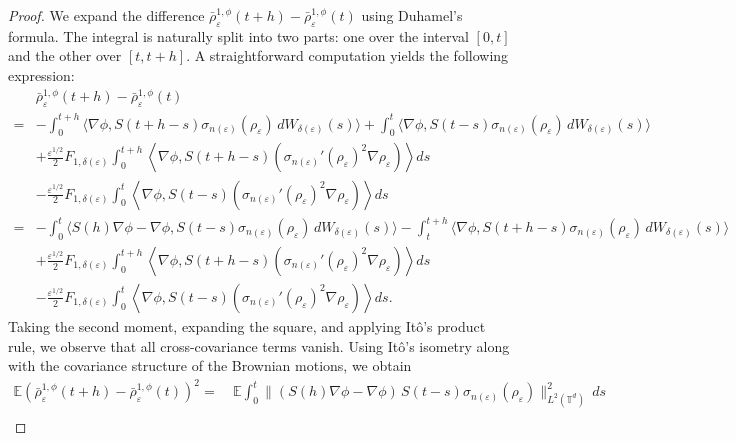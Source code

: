 \documentclass[UTF-8,reqno]{amsart}
\numberwithin{equation}{section}
\begin{document}
\begin{proof}
We expand the difference $\bar{\rho}^{1,\phi}_{\varepsilon}(t+h) - \bar{\rho}^{1,\phi}_{\varepsilon}(t)$ using Duhamel's formula. The integral is naturally split into two parts: one over the interval $[0, t]$ and the other over $[t, t+h]$. A straightforward computation yields the following expression:
\begin{align*}
&\bar{\rho}^{1,\phi}_{\varepsilon}(t+h) - \bar{\rho}^{1,\phi}_{\varepsilon}(t)\\ 
=& - \int_0^{t+h} \Big\langle \nabla\phi, S(t+h - s) \sigma_{n(\varepsilon)}(\rho_{\varepsilon}) \, dW_{\delta(\varepsilon)}(s) \Big\rangle 
+ \int_0^t \Big\langle \nabla\phi, S(t - s) \sigma_{n(\varepsilon)}(\rho_{\varepsilon}) \, dW_{\delta(\varepsilon)}(s) \Big\rangle \\
& + \frac{\varepsilon^{1/2}}{2} F_{1,\delta(\varepsilon)} \int_0^{t+h} \left\langle \nabla\phi, S(t+h - s) \left( \sigma_{n(\varepsilon)}'(\rho_{\varepsilon})^2 \nabla \rho_{\varepsilon} \right) \right\rangle ds \\
& - \frac{\varepsilon^{1/2}}{2} F_{1,\delta(\varepsilon)} \int_0^t \left\langle \nabla\phi, S(t - s) \left( \sigma_{n(\varepsilon)}'(\rho_{\varepsilon})^2 \nabla \rho_{\varepsilon} \right) \right\rangle ds \\
=& - \int_0^t \Big\langle S(h)\nabla\phi - \nabla\phi, S(t - s) \sigma_{n(\varepsilon)}(\rho_{\varepsilon}) \, dW_{\delta(\varepsilon)}(s) \Big\rangle 
- \int_t^{t+h} \Big\langle \nabla\phi, S(t+h - s) \sigma_{n(\varepsilon)}(\rho_{\varepsilon}) \, dW_{\delta(\varepsilon)}(s) \Big\rangle \\
& + \frac{\varepsilon^{1/2}}{2} F_{1,\delta(\varepsilon)} \int_0^{t+h} \left\langle \nabla\phi, S(t+h - s) \left( \sigma_{n(\varepsilon)}'(\rho_{\varepsilon})^2 \nabla \rho_{\varepsilon} \right) \right\rangle ds \\
& - \frac{\varepsilon^{1/2}}{2} F_{1,\delta(\varepsilon)} \int_0^t \left\langle \nabla\phi, S(t - s) \left( \sigma_{n(\varepsilon)}'(\rho_{\varepsilon})^2 \nabla \rho_{\varepsilon} \right) \right\rangle ds.
\end{align*}
Taking the second moment, expanding the square, and applying It\^o's product rule, we observe that all cross-covariance terms vanish. Using It\^o's isometry along with the covariance structure of the Brownian motions, we obtain
\begin{align*}
\mathbb{E} \left( \bar{\rho}^{1,\phi}_{\varepsilon}(t+h) - \bar{\rho}^{1,\phi}_{\varepsilon}(t) \right)^2 
=&\ \mathbb{E} \int_0^t \| (S(h)\nabla\phi - \nabla\phi)\, S(t - s) \sigma_{n(\varepsilon)}(\rho_{\varepsilon}) \|_{L^2(\mathbb{T}^d)}^2\, ds \\

\end{align*}
\end{proof}
\end{document}
